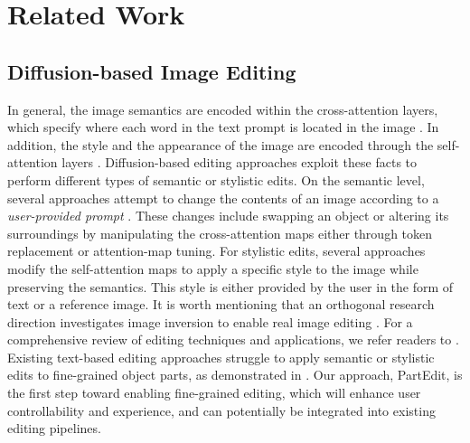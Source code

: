 
\section{Related Work}
 \label{sec:related}

\subsection{Diffusion-based Image Editing}

In general, the image semantics are encoded within the cross-attention layers, which specify where each word in the text prompt is located in the image \citep{hertz2022prompt,tang2023daam}.
In addition, the style and the appearance of the image are encoded through the self-attention layers \citep{pnp}.
Diffusion-based editing approaches exploit these facts to perform different types of semantic or stylistic edits.
On the semantic level, several approaches attempt to change the contents of an image according to a \emph{user-provided prompt} \citep{hertz2022prompt,brooks2023instructpix2pix,lin2023text,kawar2023imagic,parmar2023zero}.
These changes include swapping an object or altering its surroundings by manipulating the cross-attention maps either through token replacement or attention-map tuning.
For stylistic edits, several approaches \citep{masactrl,pnp,parmar2023zero,hertz2023style} modify the self-attention maps to apply a specific style to the image while preserving the semantics.
This style is either provided by the user in the form of text or a reference image.
It is worth mentioning that an orthogonal research direction investigates image inversion to enable real image editing \citep{brack2024ledits,huberman2024edit,brooks2023instructpix2pix}.
For a comprehensive review of editing techniques and applications, we refer readers to \citep{huang2024diffusion}.
Existing text-based editing approaches struggle to apply semantic or stylistic edits to fine-grained object parts, as demonstrated in .
Our approach, PartEdit, is the first step toward enabling fine-grained editing, which will enhance user controllability and experience, and can potentially be integrated into existing editing pipelines.


